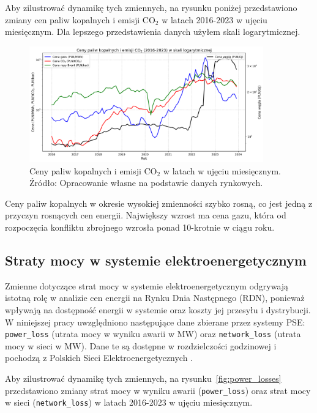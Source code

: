 Aby zilustrować dynamikę tych zmiennych, na rysunku poniżej przedstawiono zmiany cen paliw kopalnych i emisji CO$_2$ w latach 2016-2023 w ujęciu miesięcznym. Dla lepszego przedstawienia danych użyłem skali logarytmicznej.

\begin{figure}[h]
    \centering
    \includegraphics[width=0.9\textwidth]{../plots/fuels/fuel_prices_2016_2024.png}
    \caption{Ceny paliw kopalnych i emisji CO$_2$ w latach w ujęciu miesięcznym. Źródło: Opracowanie własne na podstawie danych rynkowych.}
    \label{fig:fuel_prices}
\end{figure}

Ceny paliw kopalnych w okresie wysokiej zmienności szybko rosną, co jest jedną z przyczyn rosnących cen energii. Największy wzrost ma cena gazu, która od rozpoczęcia konfliktu zbrojnego wzrosła ponad 10-krotnie w ciągu roku. 

\subsection{Straty mocy w systemie elektroenergetycznym}
\label{subsec:losses}

Zmienne dotyczące strat mocy w systemie elektroenergetycznym odgrywają istotną rolę w analizie cen energii na Rynku Dnia Następnego (RDN), ponieważ wpływają na dostępność energii w systemie oraz koszty jej przesyłu i dystrybucji. W niniejszej pracy uwzględniono następujące dane zbierane przez systemy PSE: \texttt{power\_loss} (utrata mocy w wyniku awarii w MW) oraz \texttt{network\_loss} (utrata mocy w sieci w MW). Dane te są dostępne w rozdzielczości godzinowej i pochodzą z Polskich Sieci Elektroenergetycznych \cite{PSEOLD}.

Aby zilustrować dynamikę tych zmiennych, na rysunku~\ref{fig:power_losses} przedstawiono zmiany strat mocy w wyniku awarii (\texttt{power\_loss}) oraz strat mocy w sieci (\texttt{network\_loss}) w latach 2016-2023 w ujęciu miesięcznym.


